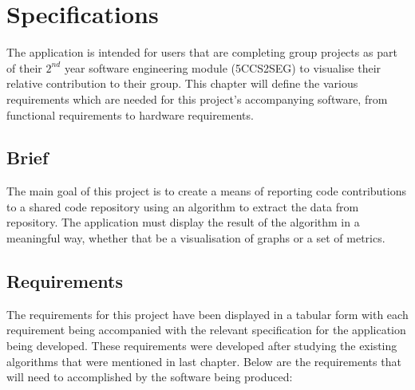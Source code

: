\chapter{Specifications}
 The application is intended for users that are completing group projects as part of their $2^{nd}$ year software engineering module (5CCS2SEG) to visualise their relative contribution to their group. This chapter will define the various requirements which are needed for this project's accompanying software, from functional requirements to hardware requirements.

\section{Brief}
The main goal of this project is to create a means of reporting code contributions to a shared code repository using an algorithm to extract the data from repository. The application must display the result of the algorithm in a meaningful way, whether that be a visualisation of graphs or a set of metrics.

\section{Requirements}
The requirements for this project have been displayed in a tabular form with each requirement being accompanied with the relevant specification for the application being developed. These requirements were developed after studying the existing algorithms that were mentioned in last chapter. Below are the requirements that will need to accomplished by the software being produced:  
\\

